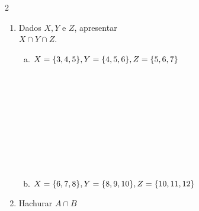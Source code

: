 \documentclass[a4paper,14pt]{article}
\begin{document}
\begin{multicols}{2}
\begin{enumerate}
\begin{enumerate}[a)]
    				\item $A = \{6, 7\}, B = \{6, 7\}$ \\\\\\\\\\\\\\\\\\\\\\
    				\item $A = \varnothing, B = \varnothing$ \\\\\\\\\\\\\\\\\\\\\\
    				\end{enumerate}
    				\item Dados $X, Y$ e $Z$, apresentar \\ $X \cap Y \cap Z$.
    				\begin{enumerate}[a)]
    					\item $X = \{3, 4, 5\}, \\ Y = \{4, 5, 6\}, \\ Z = \{5, 6, 7\}$ \\\\\\\\\\\\\\\\\\\\
    					\item $X = \{6, 7, 8\}, \\ Y = \{8, 9 ,10\}, \\ Z = \{10, 11, 12\}$ \columnbreak
    				\end{enumerate}
    				\item Hachurar $A \cap B$ \\

\end{enumerate}
\end{multicols}
\end{document}

